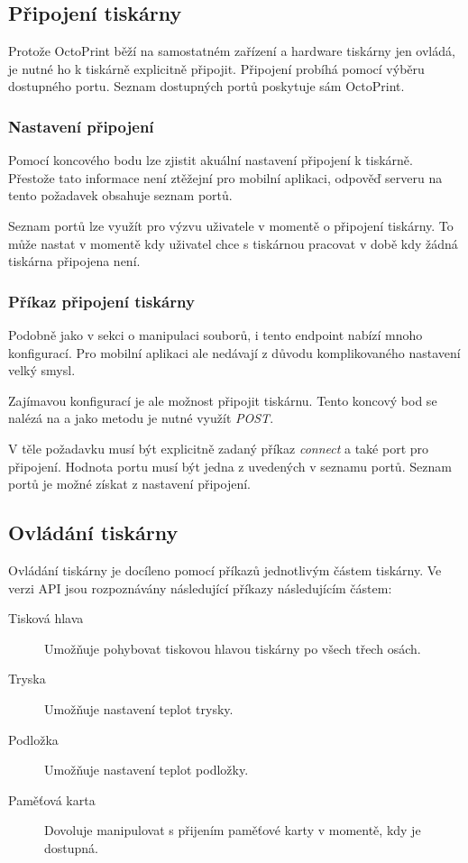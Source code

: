 \subsection{Připojení tiskárny}

Protože OctoPrint běží na samostatném zařízení a hardware tiskárny jen ovládá, je nutné ho k tiskárně explicitně připojit.
Připojení probíhá pomocí výběru dostupného portu.
Seznam dostupných portů poskytuje sám OctoPrint.

\subsubsection*{Nastavení připojení}

Pomocí koncového bodu  lze zjistit akuální nastavení připojení k tiskárně.
Přestože tato informace není ztěžejní pro mobilní aplikaci, odpověď serveru na tento požadavek obsahuje seznam portů.

Seznam portů lze využít pro výzvu uživatele v momentě o připojení tiskárny.
To může nastat v momentě kdy uživatel chce s tiskárnou pracovat v době kdy žádná tiskárna připojena není.

\subsubsection*{Příkaz připojení tiskárny}

Podobně jako v sekci o manipulaci souborů, i tento endpoint nabízí mnoho konfigurací.
Pro mobilní aplikaci ale nedávají z důvodu komplikovaného nastavení velký smysl.

Zajímavou konfigurací je ale možnost připojit tiskárnu.
Tento koncový bod se nalézá na  a jako metodu je nutné využít \textit{POST}.

V těle požadavku musí být explicitně zadaný příkaz \textit{connect} a také port pro připojení.
Hodnota portu musí být jedna z uvedených v seznamu portů.
Seznam portů je možné získat z nastavení připojení.

\subsection{Ovládání tiskárny}

Ovládání tiskárny je docíleno pomocí příkazů jednotlivým částem tiskárny.
Ve verzi API \vapi{} jsou rozpoznávány následující příkazy následujícím částem:

\begin{description}
	\item[Tisková hlava] Umožňuje pohybovat tiskovou hlavou tiskárny po všech třech osách.
	\item[Tryska] Umožňuje nastavení teplot trysky.
	\item[Podložka] Umožňuje nastavení teplot podložky.
	\item[Paměťová karta] Dovoluje manipulovat s přijením paměťové karty v momentě, kdy je dostupná.
\end{description}

